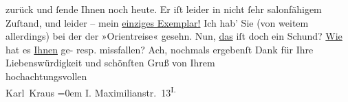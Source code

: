 \begin{ledgroupsized}[t]{13cm}
               zurück und ſende Ihnen noch heute. Er iſt leider in nicht ſehr salonfähigem Zuſtand,
               und leider – mein \uline{einziges Exemplar!}\pend
           \pstart
           {\pb}Ich hab’ Sie (von weitem allerdings) bei
               der \label{K_L00130-2v}\label{K_L00130-2h} der »Orientreise« gesehn. Nun, \uline{das} iſt doch ein
               Schund? \uline{Wie} hat es \uline{Ihnen} ge- resp. missfallen?\pend
           \pstart
           Ach, nochmals ergebenſt Dank für Ihre Liebenswürdigkeit und schönſten Gruß\pend
           \pstart
           von Ihrem{\\[\baselineskip]}hochachtungsvollen{\\[\baselineskip]}\spacefill\mbox{Karl Kraus}\pend
           \leftskip=0em{}\pstart
           \noindent{}I. Maximilianstr. 13\textsuperscript{I.}\pend
           
         
         \endnumbering{}\end{ledgroupsized}  \newcommand{\dateiname}{L00130}\newcommand{\titel}{Karl Kraus an Arthur Schnitzler, 31. 10. 1892}\newcommand{\editorInnen}{Martin Anton Müller und Gerd-Hermann Susen}
      